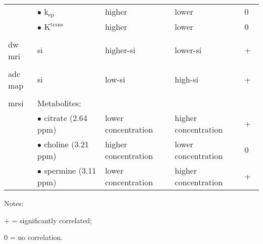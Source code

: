 \begin{landscape}
\begin{table}
\begin{threeparttable}
\begin{tabularx}{\linewidth}{@{} l X X X l @{}}
        & $\bullet$ $\text{k}_{\text{ep}}$ & higher & lower & 0 \\
        & $\bullet$ $\text{K}^{\text{trans}}$ & higher & lower & 0 \\ \\
        \acs*{dw} \acs*{mri} & \acs*{si} & higher-\acs*{si}~\cite{Huisman2003,Barentsz2012} & lower-\acs*{si}~\cite{Huisman2003,Barentsz2012} & + \\ \\ 
        \acs*{adc} map & \acs*{si} & low-\acs*{si}~\cite{Barentsz2012} & high-\acs*{si}~\cite{Barentsz2012} & +~\cite{Hambrock2011, Itou2011, Peng2013} \\ \\
        \acs*{mrsi}& Metabolites: & & & \\
        & $\bullet$ citrate (2.64 ppm)~\cite{Verma2010} & lower concentration~\cite{Awwad2012,Costello2006,Graaf2000} & higher concentration~\cite{Awwad2012,Costello2006,Graaf2000} & +~\cite{Giskeodegard2013} \\
        & $\bullet$ choline (3.21 ppm)~\cite{Verma2010} & higher concentration~\cite{Awwad2012,Costello2006,Graaf2000} & lower concentration~\cite{Awwad2012,Costello2006,Graaf2000} & 0~\cite{Giskeodegard2013} \\
        & $\bullet$ spermine (3.11 ppm)~\cite{Verma2010} & lower concentration~\cite{Awwad2012,Costello2006,Graaf2000} & higher concentration~\cite{Awwad2012,Costello2006,Graaf2000} & +~\cite{Giskeodegard2013} \\
        \bottomrule
      \end{tabularx}
      \begin{tablenotes}
      \item Notes:
      \item + = significantly correlated;
      \item 0 = no correlation.
      \end{tablenotes}
    \end{threeparttable}
  \label{tab:modmri}
\end{table}
\end{landscape}
